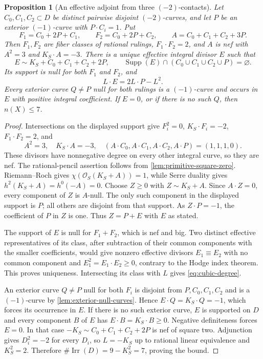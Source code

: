\documentclass[11pt,reqno]{amsart}
\newtheorem{proposition}[proposition]{Proposition}
\theoremstyle{definition}
\theoremstyle{remark}
\DeclareMathOperator{\Supp}{Supp}
\DeclareMathOperator{\Irr}{Irr}
\newcommand{\cO}{\mathcal O}
\numberwithin{equation}{section}
\begin{document}
\begin{proposition}[An effective adjoint from three $(-2)$-contacts]
\label{prop:cubic-adjoint}
Let $C_0,C_1,C_2\subset D$ be distinct pairwise disjoint $(-2)$-curves,
and let $P$ be an exterior $(-1)$-curve with $P\cdot C_i=1$. Put
\[
 F_1=C_0+2P+C_1,\qquad F_2=C_0+2P+C_2,\qquad
 A=C_0+C_1+C_2+3P.
\]
Then $F_1,F_2$ are fiber classes of rational rulings,
$F_1\cdot F_2=2$, and $A$ is nef with $A^2=3$ and $K_S\cdot A=-3$.
There is a unique effective integral divisor $E$ such that
\[
 E\sim K_S+C_0+C_1+C_2+2P,\qquad
 \Supp(E)\cap(C_0\cup C_1\cup C_2\cup P)=\varnothing.
\]
Its support is null for both $F_1$ and $F_2$, and
\begin{equation}\label{eq:cubic-degree}
 L\cdot E=2L\cdot P-L^2.
\end{equation}
Every exterior curve $Q\ne P$ null for both rulings is a $(-1)$-curve
and occurs in $E$ with positive integral coefficient. If $E=0$, or
if there is no such $Q$, then $n(X)\le7$.
\end{proposition}
\begin{proof}
Intersections on the displayed support give $F_i^2=0$,
$K_S\cdot F_i=-2$, $F_1\cdot F_2=2$, and
\[
 A^2=3,\quad K_S\cdot A=-3,\quad
 (A\cdot C_0,A\cdot C_1,A\cdot C_2,A\cdot P)=(1,1,1,0).
\]
These divisors have nonnegative degree on every other integral curve,
so they are nef. The rational-pencil assertion follows from
\cref{lem:primitive-square-zero}. Riemann--Roch gives
$\chi(\cO_S(K_S+A))=1$, while Serre duality gives
$h^2(K_S+A)=h^0(-A)=0$. Choose $Z\ge0$ with $Z\sim K_S+A$.
Since $A\cdot Z=0$, every component of $Z$ is $A$-null.
The only such component in the displayed support is $P$; all others
are disjoint from that support. As $Z\cdot P=-1$, the coefficient
of $P$ in $Z$ is one. Thus $Z=P+E$ with $E$ as stated.

The support of $E$ is null for $F_1+F_2$, which is nef and big.
Two distinct effective representatives of its class, after subtraction
of their common components with the smaller coefficients, would give
nonzero effective divisors $E_1\equiv E_2$ with no common component
and $E_1^2=E_1\cdot E_2\ge0$, contrary to the Hodge index theorem.
This proves uniqueness. Intersecting its class with $L$ gives
\eqref{eq:cubic-degree}.

An exterior curve $Q\ne P$ null for both $F_i$ is disjoint from
$P,C_0,C_1,C_2$ and is a $(-1)$-curve by
\cref{lem:exterior-null-curves}. Hence $E\cdot Q=K_S\cdot Q=-1$,
which forces its occurrence in $E$. If there is no such exterior
curve, $E$ is supported on $D$ and every component $B$ of $E$ has
$E\cdot B=K_S\cdot B\ge0$. Negative definiteness forces $E=0$.
In that case $-K_S\sim C_0+C_1+C_2+2P$ is nef of square two.
Adjunction gives $D_i^2=-2$ for every $D_i$, so $L=-K_S$ up to
rational linear equivalence and $K_S^2=2$. Therefore
$\#\Irr(D)=9-K_S^2=7$, proving the bound.
\end{proof}
\end{document}
